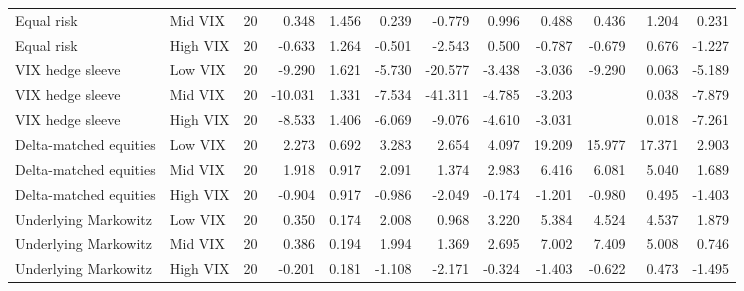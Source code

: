 \begin{tabular}{llrrrrrrrrrr}
Equal risk & Mid VIX & 20 & 0.348 & 1.456 & 0.239 & -0.779 & 0.996 & 0.488 & 0.436 & 1.204 & 0.231 \\
Equal risk & High VIX & 20 & -0.633 & 1.264 & -0.501 & -2.543 & 0.500 & -0.787 & -0.679 & 0.676 & -1.227 \\
VIX hedge sleeve & Low VIX & 20 & -9.290 & 1.621 & -5.730 & -20.577 & -3.438 & -3.036 & -9.290 & 0.063 & -5.189 \\
VIX hedge sleeve & Mid VIX & 20 & -10.031 & 1.331 & -7.534 & -41.311 & -4.785 & -3.203 &  & 0.038 & -7.879 \\
VIX hedge sleeve & High VIX & 20 & -8.533 & 1.406 & -6.069 & -9.076 & -4.610 & -3.031 &  & 0.018 & -7.261 \\
Delta-matched equities & Low VIX & 20 & 2.273 & 0.692 & 3.283 & 2.654 & 4.097 & 19.209 & 15.977 & 17.371 & 2.903 \\
Delta-matched equities & Mid VIX & 20 & 1.918 & 0.917 & 2.091 & 1.374 & 2.983 & 6.416 & 6.081 & 5.040 & 1.689 \\
Delta-matched equities & High VIX & 20 & -0.904 & 0.917 & -0.986 & -2.049 & -0.174 & -1.201 & -0.980 & 0.495 & -1.403 \\
Underlying Markowitz & Low VIX & 20 & 0.350 & 0.174 & 2.008 & 0.968 & 3.220 & 5.384 & 4.524 & 4.537 & 1.879 \\
Underlying Markowitz & Mid VIX & 20 & 0.386 & 0.194 & 1.994 & 1.369 & 2.695 & 7.002 & 7.409 & 5.008 & 0.746 \\
Underlying Markowitz & High VIX & 20 & -0.201 & 0.181 & -1.108 & -2.171 & -0.324 & -1.403 & -0.622 & 0.473 & -1.495 \\
\bottomrule
\end{tabular}
